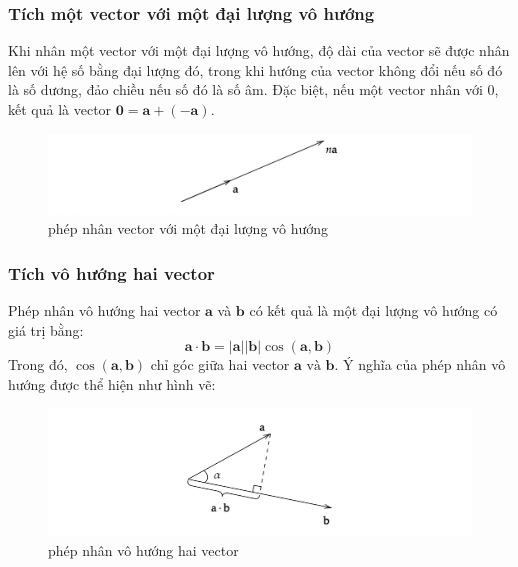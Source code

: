 \subsubsection{Tích một vector với một đại lượng vô hướng}
Khi nhân một vector với một đại lượng vô hướng, độ dài của vector sẽ được nhân lên với hệ số bằng đại lượng đó, trong khi hướng của vector không đổi nếu số đó là số dương, đảo chiều nếu số đó là số âm. Đặc biệt, nếu một vector nhân với \(0\), kết quả là vector \(\mathbf{0}=\mathbf{a}+(-\mathbf{a})\).
\begin{figure}[H]
    \centering
    \includegraphics[width=1\textwidth]{Tuan2/Figures/vector x vo huong.png}
    \caption{phép nhân vector với một đại lượng vô hướng}
\end{figure}

\subsubsection{Tích vô hướng hai vector}
Phép nhân vô hướng hai vector \(\mathbf{a}\) và \(\mathbf{b}\) có kết quả là một đại lượng vô hướng có giá trị bằng:
\begin{equation}
    \mathbf{a} \cdot \mathbf{b} = |\mathbf{a}| |\mathbf{b}| \cos (\mathbf{a}, \mathbf{b})
\end{equation}
Trong đó, \(\cos (\mathbf{a}, \mathbf{b})\) chỉ góc giữa hai vector \(\mathbf{a} \text{ và }\mathbf{b}\).
Ý nghĩa của phép nhân vô hướng được thể hiện như hình vẽ:
\begin{figure}[H]
    \centering
    \includegraphics[width=1\textwidth]{Tuan2/Figures/tichcham.png}
    \caption{phép nhân vô hướng hai vector}
\end{figure}
